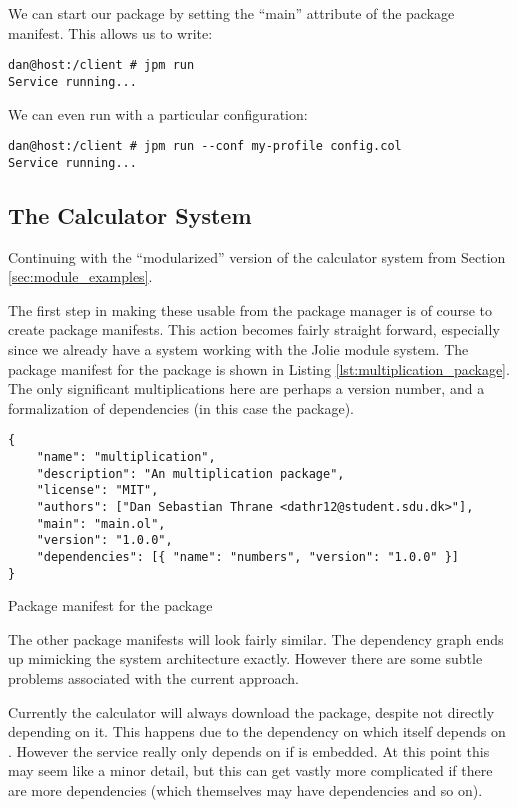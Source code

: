 We can start our package by setting the ``main'' attribute of the package
manifest. This allows us to write:

\begin{verbatim}
dan@host:/client # jpm run
Service running...
\end{verbatim}

We can even run with a particular configuration:

\begin{verbatim}
dan@host:/client # jpm run --conf my-profile config.col
Service running...
\end{verbatim}

\subsection{The Calculator System}

Continuing with the ``modularized'' version of the calculator system from
Section \ref{sec:module_examples}.

The first step in making these usable from the package manager is of course to
create package manifests. This action becomes fairly straight forward,
especially since we already have a system working with the Jolie module system.
The package manifest for the  package is shown in Listing
\ref{lst:multiplication_package}. The only significant multiplications here are
perhaps a version number, and a formalization of dependencies (in this case the
 package).

\begin{listing}[H]
\begin{verbatim}
{
    "name": "multiplication",
    "description": "An multiplication package",
    "license": "MIT",
    "authors": ["Dan Sebastian Thrane <dathr12@student.sdu.dk>"],
    "main": "main.ol",
    "version": "1.0.0",
    "dependencies": [{ "name": "numbers", "version": "1.0.0" }]
}
\end{verbatim}
\caption{Package manifest for the  package}
\label{lst:multiplication_package}
\end{listing}

The other package manifests will look fairly similar. The dependency graph ends
up mimicking the system architecture exactly. However there are some subtle
problems associated with the current approach.

Currently the calculator will always download the  package,
despite not directly depending on it. This happens due to the dependency on
 which itself depends on . However the
 service really only depends on  if
 is embedded. At this point this may seem like a minor
detail, but this can get vastly more complicated if there are more dependencies
(which themselves may have dependencies and so on).


